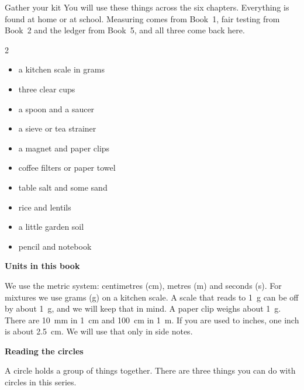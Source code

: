 \begin{tryit}{Gather your kit}
You will use these things across the six chapters. Everything is found at home or at school. Measuring comes from Book~1, fair testing from Book~2 and the ledger from Book~5, and all three come back here.
\begin{multicols}{2}
\begin{itemize}[leftmargin=1.2em]
\item a kitchen scale in grams
\item three clear cups
\item a spoon and a saucer
\item a sieve or tea strainer
\item a magnet and paper clips
\item coffee filters or paper towel
\item table salt and some sand
\item rice and lentils
\item a little garden soil
\item pencil and notebook
\end{itemize}
\end{multicols}
\end{tryit}

{\sans\bfseries\large\color{sky!70!black} Units in this book}\par
We use the metric system: centimetres (cm), metres (m) and seconds (s). For mixtures we use grams (g) on a kitchen scale. A scale that reads to 1~g can be off by about 1~g, and we will keep that in mind. A paper clip weighs about 1~g.
There are 10~mm in 1~cm and 100~cm in 1~m. If you are used to inches, one inch is about 2.5~cm. We will use that only in side notes.
\clearpage

\thispagestyle{plain}\label{circlecard}
{\sans\bfseries\LARGE\color{ink} Reading the circles}\par\vspace{0.1cm}
A circle holds a group of things together. There are three things you can do with circles in this series.


